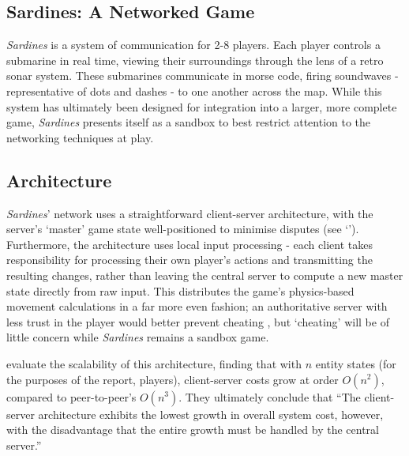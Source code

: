 \documentclass[a4paper, 9pt]{article}
\begin{document}
\graphicspath{{./Images/}}
\begin{flushleft}

\section*{Sardines: A Networked Game}

\textit{Sardines} is a system of communication for 2-8 players. Each player controls a submarine in real time, viewing their surroundings through the lens of a retro sonar system. These submarines communicate in morse code, firing soundwaves - representative of dots and dashes - to one another across the map. While this system has ultimately been designed for integration into a larger, more complete game, \textit{Sardines} presents itself as a sandbox to best restrict attention to the networking techniques at play.

\subsection*{Architecture}\label{Architecture}

\textit{Sardines}' network uses a straightforward client-server architecture, with the server's `master' game state well-positioned to minimise disputes (see `'). Furthermore, the architecture uses local input processing - each client takes responsibility for processing their own player's actions and transmitting the resulting changes, rather than leaving the central server to compute a new master state directly from raw input. This distributes the game's physics-based movement calculations in a far more even fashion; an authoritative server with less trust in the player would better prevent cheating \citep{gmbta10}, but `cheating' will be of little concern while \textit{Sardines} remains a sandbox game.

\vspace{5pt}\noindent
\citeauthor{bauer04} \citeyearpar{bauer04} evaluate the scalability of this architecture, finding that with $n$ entity states (for the purposes of the report, players), client-server costs grow at order $O(n^2)$, compared to peer-to-peer's $O(n^3)$. They ultimately conclude that ``The client-server architecture exhibits the lowest growth in overall system cost, however, with the disadvantage that the entire growth must be handled by the central server.''  


\end{flushleft}
\end{document}
